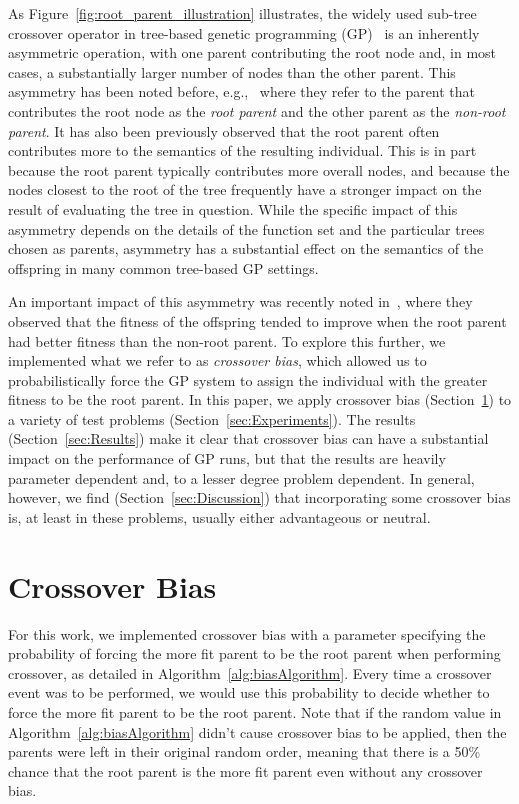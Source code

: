 \documentclass{sig-alternate}
\begin{document}
As Figure~\ref{fig:root_parent_illustration} illustrates, the widely used sub-tree crossover operator in tree-based 
genetic programming (GP)~\cite{poli08:fieldguide} is an inherently
asymmetric operation, with one parent contributing the root node and, in most cases, a substantially larger
number of nodes than the other parent. This asymmetry has been noted before, e.g.,~\cite{mcphee1999analysis}
where they refer to the parent that contributes the root node as the \emph{root parent} and the other parent as
the \emph{non-root parent}.
It has also been previously observed 
\cite{burlacu2013visualization, McPheeDonatucciDramdahl:2014,  McPhee:2008:SBB:1792694.1792707} 
that the root parent often contributes more to the semantics of the resulting 
individual. This is in part because the root parent typically contributes more 
overall nodes, and because the nodes closest to the root of the tree frequently have a stronger
impact on the result of evaluating the tree in question. While the specific impact of this asymmetry depends on the details of the function set and the particular trees chosen as parents,  asymmetry has a substantial effect on the semantics of the offspring in many common 
tree-based GP settings. 

An important impact of this asymmetry was recently noted in~\cite{McPheeDonatucciDramdahl:2014},
where they observed that the fitness of the offspring tended to improve when the root parent had better 
fitness than
the non-root parent.
To explore this further, we implemented what we refer to as \emph{crossover bias}, which allowed us to
probabilistically force the GP system to assign the individual with the greater 
fitness to be the root parent. In this paper, we apply crossover bias (Section~\ref{sec:XObias}) 
to a variety of test problems (Section~\ref{sec:Experiments}). The results 
(Section~\ref{sec:Results}) make it clear that crossover bias can have a substantial impact on the 
performance of GP runs, but that the results are heavily parameter dependent and, to a lesser degree 
problem dependent. In general, however, we find (Section~\ref{sec:Discussion}) that incorporating 
some crossover bias is, at least in these problems, usually either advantageous or neutral. 

\section{Crossover Bias} \label{sec:XObias}

For this work, we implemented crossover bias with a parameter specifying the probability of forcing 
the more fit parent to be the root parent when performing crossover, as detailed in 
Algorithm~\ref{alg:biasAlgorithm}. Every time a 
crossover event was to be performed, we would use this probability to decide whether to force the 
more fit parent to be the root parent. Note that if the random value in Algorithm~\ref{alg:biasAlgorithm} 
didn't cause crossover bias to be applied, then the parents were left in their original random order, 
meaning that there is a 50\% chance that the root 
parent is the more fit parent even without any crossover bias.
\end{document}
